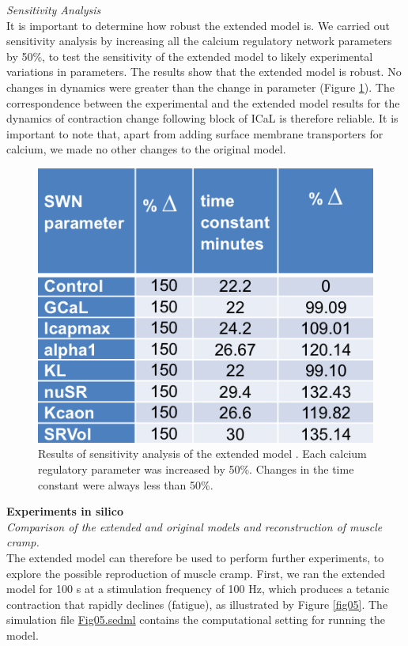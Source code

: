 \documentclass[fleqn,10pt]{physiome}
\begin{document}
\textit{Sensitivity Analysis}\\\newline
It is important to determine how robust the extended model is. We carried out sensitivity analysis by increasing all the calcium regulatory network parameters by 50\%, to test the sensitivity of the extended model to likely experimental variations in parameters. The results show that the extended model is robust. No changes in dynamics were greater than the change in parameter (Figure \ref{fig04}). The correspondence between the experimental and the extended model results for the dynamics of contraction change following block of ICaL is therefore reliable. It is important to note that, apart from adding surface membrane transporters for calcium, we made no other changes to the original model.\newline
\begin{figure}[h!]
\centering
\includegraphics[width=0.43\linewidth]{figure04}
\caption{Results of sensitivity analysis of the extended model \citep{Noble2019Incorporation}.  Each calcium regulatory parameter was increased by 50\%. Changes in the time constant were always less than 50\%.}
\label{fig04}
\end{figure}
\textbf{Experiments in silico}\\\newline
\textit{Comparison of the extended and original models and reconstruction of muscle cramp.}\\\newline
The extended model can therefore be used to perform further experiments, to explore the possible reproduction of muscle cramp. First, we ran the extended model for 100 s at a stimulation frequency of 100 Hz, which produces a tetanic contraction that rapidly declines (fatigue), as illustrated by Figure \ref{fig05}. The simulation file \href{http://models.cellml.org/workspace/5f4/file/4071d5b4ec40c5e2b845a7a75e942df1966d2ba2/Fig05.sedml}{Fig05.sedml} contains the computational setting for running the model.\newpage
\end{document}

